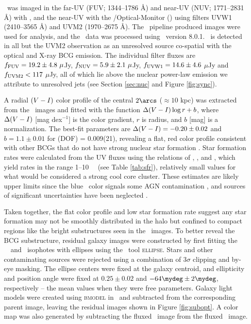 \documentclass[iop]{emulateapj-rtx4}
\begin{document}
\rbs\ was imaged in the far-UV (FUV; 1344--1786 \AA) and near-UV (NUV;
1771--2831 \AA) with \galex, and the near-UV with the
\xmm/Optical-Monitor (\xom) using filters UVW1 (2410--3565 \AA) and
UVM2 (1970--2675 \AA). The \galex\ pipeline produced images were used
for analysis, and the \xom\ data was processed using \sas\ version
8.0.1. \rbs\ is detected in all but the UVM2 observation as an
unresolved source co-spatial with the optical and X-ray BCG
emission. The individual filter fluxes are $f_{\rm{FUV}} = 19.2 \pm
4.8 ~\mu$Jy, $f_{\rm{NUV}} = 5.9 \pm 2.1 ~\mu$Jy, $f_{\rm{UVW1}} =
14.6 \pm 4.6$ $\mu$Jy and $f_{\rm{UVM2}} < 117$ $\mu$Jy, all of which
lie above the nuclear power-law emission we attribute to unresolved
jets (see Section \ref{sec:nuc} and Figure \ref{fig:sync}).

A radial $(V-I)$ color profile of the central $2\arcs$ ($\approx
10$ kpc) was extracted from the \hst\ images and fitted with the
function $\Delta(V-I) \log r + b$, where $\Delta(V-I)$
[mag dex$^{-1}$] is the color gradient, $r$ is radius, and $b$ [mag]
is a normalization. The best-fit parameters are $\Delta(V-I) =
-0.20 \pm 0.02$ and $b = 1.1 \pm 0.01$ for \chisq(DOF) = 0.009(21),
revealing a flat, red color profile consistent with other BCGs that do
not have strong nuclear star formation \citep[\eg][]{rafferty06}. Star
formation rates were calculated from the UV fluxes using the relations
of \citet{kennicutt2}, \citet{2006ApJ...642..775M}, and
\citet{salim2007}, which yield rates in the range 1--10 ~\msolpy\ (see
Table \ref{tab:sfr}), relatively small values for what would be
considered a strong cool core cluster. These estimates are likely
upper limits since the blue \galex\ color signals some AGN
contamination \citep{2005AJ....130.1022A}, and sources of significant
uncertainties have been neglected \citep[\eg][]{1992ApJ...388..310K,
  2004AJ....127.2002K, hicksuv, 2010MNRAS.tmp..626G}.

Taken together, the flat color profile and low star formation rate
suggest any star formation may not be smoothly distributed in the halo
but confined to compact regions like the bright substructures seen in
the \hst\ images. To better reveal the BCG substructure, residual
galaxy images were constructed by first fitting the \hst\ \myv\ and
\myi\ isophotes with ellipses using the \iraf\ tool
                {\textsc{ellipse}}. Stars and other contaminating
                sources were rejected using a combination of $3\sigma$
                clipping and by-eye masking. The ellipse centers were
                fixed at the galaxy centroid, and ellipticity and
                position angle were fixed at $0.25 \pm 0.02$ and
                $-64\mydeg \pm 2\mydeg$, respectively -- the mean
                values when they were free parameters. Galaxy light
                models were created using {\textsc{bmodel}} in
                \iraf\ and subtracted from the corresponding parent
                image, leaving the residual images shown in Figure
                \ref{fig:subopt}. A color map was also generated by
                subtracting the fluxed \myi\ image from the fluxed
                \myv\ image.
\end{document}
